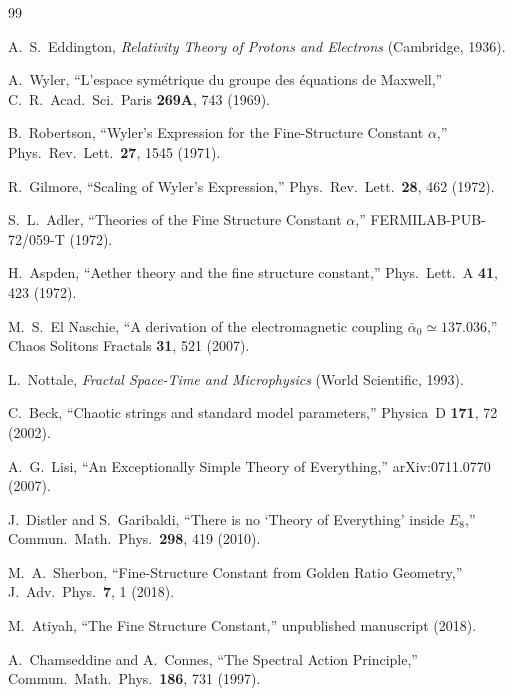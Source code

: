 \documentclass[11pt,a4paper]{article}
\begin{document}
\begin{thebibliography}{99}

 A.~S.~Eddington, \textit{Relativity Theory of Protons and Electrons} (Cambridge, 1936).

 A.~Wyler, ``L'espace sym\'etrique du groupe des \'equations de Maxwell,'' C.~R.~Acad.~Sci.~Paris \textbf{269A}, 743 (1969).

 B.~Robertson, ``Wyler's Expression for the Fine-Structure Constant $\alpha$,'' Phys.~Rev.~Lett.\ \textbf{27}, 1545 (1971).

 R.~Gilmore, ``Scaling of Wyler's Expression,'' Phys.~Rev.~Lett.\ \textbf{28}, 462 (1972).

 S.~L.~Adler, ``Theories of the Fine Structure Constant $\alpha$,'' FERMILAB-PUB-72/059-T (1972).

 H.~Aspden, ``Aether theory and the fine structure constant,'' Phys.~Lett.~A \textbf{41}, 423 (1972).

 M.~S.~El Naschie, ``A derivation of the electromagnetic coupling $\bar{\alpha}_0 \simeq 137.036$,'' Chaos Solitons Fractals \textbf{31}, 521 (2007).

 L.~Nottale, \textit{Fractal Space-Time and Microphysics} (World Scientific, 1993).

 C.~Beck, ``Chaotic strings and standard model parameters,'' Physica~D \textbf{171}, 72 (2002).

 A.~G.~Lisi, ``An Exceptionally Simple Theory of Everything,'' arXiv:0711.0770 (2007).

 J.~Distler and S.~Garibaldi, ``There is no `Theory of Everything' inside $E_8$,'' Commun.~Math.~Phys.\ \textbf{298}, 419 (2010).

 M.~A.~Sherbon, ``Fine-Structure Constant from Golden Ratio Geometry,'' J.~Adv.~Phys.\ \textbf{7}, 1 (2018).

 M.~Atiyah, ``The Fine Structure Constant,'' unpublished manuscript (2018).

 A.~Chamseddine and A.~Connes, ``The Spectral Action Principle,'' Commun.~Math.~Phys.\ \textbf{186}, 731 (1997).


\end{thebibliography}
\end{document}
